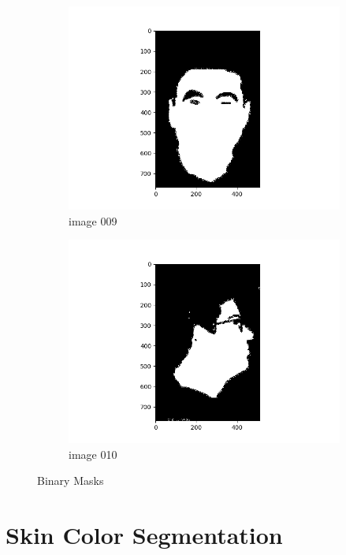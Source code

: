 \documentclass[11pt]{report}
\begin{document}
\begin{figure}[H]
\begin{subfigure}{0.3\textwidth}
        \includegraphics[width=\textwidth]{Task 2 Plots/bin_mask_009.png}
        \caption{image 009}
        \label{fig:binmask9}
    \end{subfigure}
    \begin{subfigure}{0.3\textwidth}
        \centering
        \includegraphics[width=\textwidth]{Task 2 Plots/bin_mask_010.png}
        \caption{image 010}
        \label{fig:binmask10}
    \end{subfigure}
    \caption{Binary Masks}
    \label{fig:binmasksall}
\end{figure}

\newpage

\section{Skin Color Segmentation}
\end{document}
